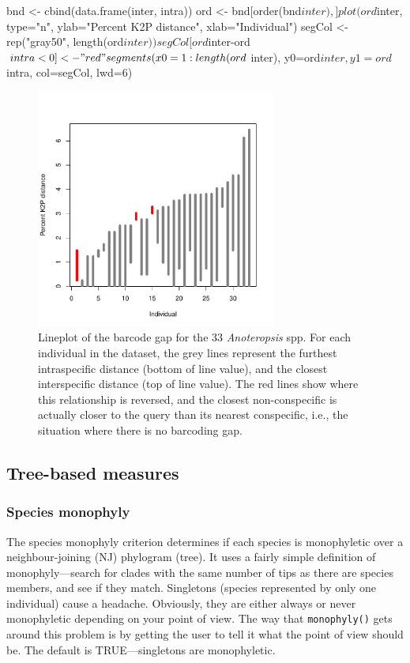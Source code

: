 \documentclass{article}
\newcommand{\fun}[1]{\texttt{#1}}
\begin{document}
\begin{console}
bnd <- cbind(data.frame(inter, intra))
ord <- bnd[order(bnd$inter),]
plot(ord$inter, type="n", ylab="Percent K2P distance", xlab="Individual")
segCol <- rep("gray50", length(ord$inter))
segCol[ord$inter-ord$intra < 0] <- "red"
segments(x0=1:length(ord$inter), y0=ord$inter, y1=ord$intra, col=segCol, lwd=6)
\end{console}

\begin{figure}[p]
	\centering
	\includegraphics[width=0.7\textwidth,trim= 3cm 0cm 3cm 0cm]{barcode_gap}
	\caption{Lineplot of the barcode gap for the 33 \emph{Anoteropsis} spp. For each individual in the dataset, the grey lines represent the furthest intraspecific distance (bottom of line value), and the closest interspecific distance (top of line value). The red lines show where this relationship is reversed, and the closest non-conspecific is actually closer to the query than its nearest conspecific, i.e., the situation where there is no barcoding gap.}
	\label{barcode_gap.fig}
\end{figure}

\subsection{Tree-based measures}

\subsubsection{Species monophyly}

The species monophyly criterion determines if each species is monophyletic over a neighbour-joining (NJ) phylogram (tree). It uses a fairly simple definition of monophyly---search for clades with the same number of tips as there are species members, and see if they match. Singletons (species represented by only one individual) cause a headache. Obviously, they are either always or never monophyletic depending on your point of view. The way that \fun{monophyly()} gets around this problem is by getting the user to tell it what the point of view should be. The default is TRUE---singletons are monophyletic.
\end{document}
